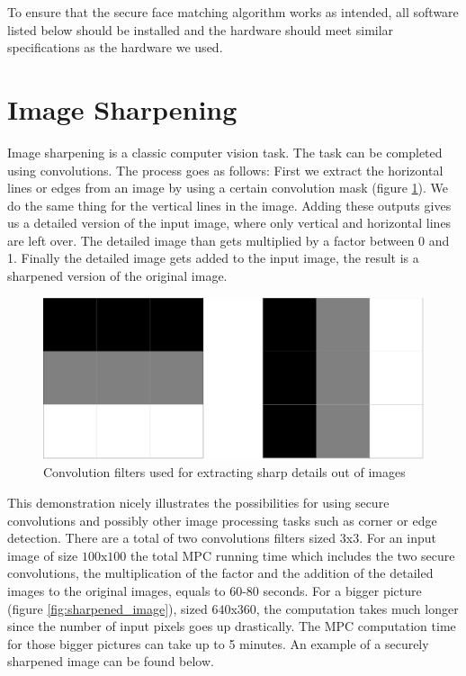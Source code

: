 To ensure that the secure face matching algorithm works as intended, all software listed below should be installed and the hardware should meet similar specifications as the hardware we used.

\section{Image Sharpening}
Image sharpening is a classic computer vision task. The task can be completed using convolutions. The process goes as follows: First we extract the horizontal lines or edges from an image by using a certain convolution mask (figure \ref{fig:sharp_mask}). We do the same thing for the vertical lines in the image. Adding these outputs gives us a detailed version of the input image, where only vertical and horizontal lines are left over. The detailed image than gets multiplied by a factor between 0 and 1. Finally the detailed image gets added to the input image, the result is a sharpened version of the original image.

\begin{figure}[H]
  \includegraphics[scale=0.1]{fig/sharp_mask.png}
  \centering
  \caption{Convolution filters used for extracting sharp details out of images}
  \label{fig:sharp_mask}
\end{figure}

This demonstration nicely illustrates the possibilities for using secure convolutions and possibly other image processing tasks such as corner or edge detection. There are a total of two convolutions filters sized $3$x$3$. For an input image of size $100$x$100$ the total MPC running time which includes the two secure convolutions, the multiplication of the factor and the addition of the detailed images to the original images, equals to 60-80 seconds. For a bigger picture (figure \ref{fig:sharpened_image}), sized $640$x$360$, the computation takes much longer since the number of input pixels goes up drastically. The MPC computation time for those bigger pictures can take up to 5 minutes. An example of a securely sharpened image can be found below.

